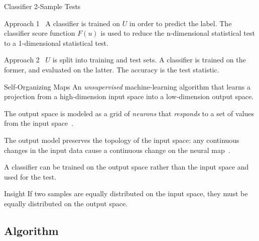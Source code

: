 \documentclass[10pt]{beamer}
\begin{document}
\begin{frame}{Classifier 2-Sample Tests}
    \begin{block}{Approach 1~\cite{friedman2004multivariate}}
        A classifier is trained on $U$ in order to predict the label. The classifier score function $F(u)$ is used
        to reduce the n-dimensional statistical test to a 1-dimensional statistical test.
    \end{block}
    \begin{block}{Approach 2~\cite{lopez2016revisiting}}
        $U$ is split into training and test sets. A classifier is trained on the former, and evaluated on the latter.
        The accuracy is the test statistic.
    \end{block}
\end{frame}

\begin{frame}{Self-Organizing Maps}
    An \emph{unsupervised} machine-learning algorithm that learns
    a projection from a high-dimension input space into a low-dimension output space.

    \smallskip
    
    The output space is modeled as a grid of \emph{neurons} that \emph{responds} to a set of
    values from the input space~\cite{kohonen1982self}.

    \smallskip
    
    \alert{The output model preserves the topology of the input space}: any continuous changes
    in the input data cause a continuous change on the neural map~\cite{Villmann1999}.

    \smallskip

    A classifier can be trained on the output space rather than the input space and used for the test.
    
    \begin{alertblock}{Insight}
        \smallskip
        If two samples are equally distributed on the input space, they must be equally distributed on the output space.
    \end{alertblock}    
\end{frame}

\subsection{Algorithm}
\end{document}
